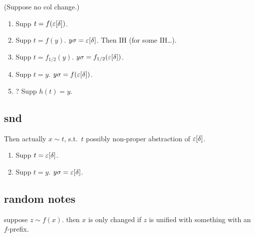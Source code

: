 \documentclass[,%
	paper=a4,%
	DIV11, %
	twoside=false,%
	liststotoc,
	bibtotoc,
	draft=false,%
	numbers=noendperiod
]{scrartcl}
\begin{document}
(Suppose no col change.)

\begin{enumerate}
	\item Supp $t = f(\varepsilon[\delta])$. \checkmark
	\item Supp $t = f(y)$.
		$y\sigma = \varepsilon[\delta]$.
		Then IH (for some IH\dots).
	\item Supp $t = f_{1/2}(y)$.
		$y\sigma = f_{1/2}(\varepsilon[\delta])$.
	\item Supp $t = y$.
		$y\sigma = f(\varepsilon[\delta])$.
	\item ? Supp $h(t) = y$.
\end{enumerate}

\subsection{snd}

Then actually $x \sim t$, s.t.\ $t$ possibly non-proper abstraction of $\varepsilon[\delta]$.

\begin{enumerate}
	\item Supp $t = \varepsilon[\delta]$. \checkmark
	\item Supp $t = y$.
		$y\sigma = \varepsilon[\delta]$.
\end{enumerate}

\subsection{random notes}

suppose $z\sim f(x)$.
then $x$ is only changed if $z$ is unified with something with an $f$-prefix.



\end{document}
